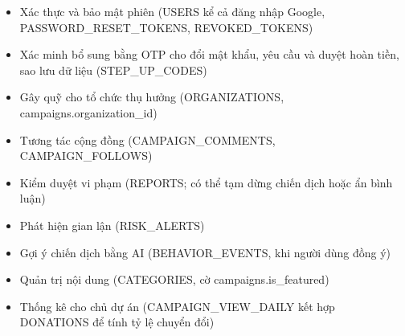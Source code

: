 \begin{itemize}
    \item Xác thực và bảo mật phiên (USERS kể cả đăng nhập Google, PASSWORD\_\allowbreak{}RESET\_\allowbreak{}TOKENS, REVOKED\_\allowbreak{}TOKENS)
    \item Xác minh bổ sung bằng OTP cho đổi mật khẩu, yêu cầu và duyệt hoàn tiền, sao lưu dữ liệu (STEP\_\allowbreak{}UP\_\allowbreak{}CODES)
    \item Gây quỹ cho tổ chức thụ hưởng (ORGANIZATIONS, campaigns.organization\_\allowbreak{}id)
    \item Tương tác cộng đồng (CAMPAIGN\_\allowbreak{}COMMENTS, CAMPAIGN\_\allowbreak{}FOLLOWS)
    \item Kiểm duyệt vi phạm (REPORTS; có thể tạm dừng chiến dịch hoặc ẩn bình luận)
    \item Phát hiện gian lận (RISK\_\allowbreak{}ALERTS)
    \item Gợi ý chiến dịch bằng AI (BEHAVIOR\_\allowbreak{}EVENTS, khi người dùng đồng ý)
    \item Quản trị nội dung (CATEGORIES, cờ campaigns.is\_\allowbreak{}featured)
    \item Thống kê cho chủ dự án (CAMPAIGN\_\allowbreak{}VIEW\_\allowbreak{}DAILY kết hợp DONATIONS để tính tỷ lệ chuyển đổi)
\end{itemize}
